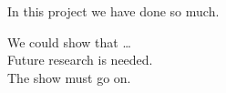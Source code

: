 \label{chap:6_discussion}
In this project we have done so much.

We could show that \ldots \\

Future research is needed.\\
The show must go on.